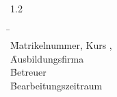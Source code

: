 \begin{titlepage}
\begin{spacing}{1.2}
        \centering
        \begin{tabbing}
            \hspace{0.5\textwidth}                 \= \kill                       \\
            \f{Matrikelnummer, Kurs}               \>  \myMatrikelnummer, \myKurs \\
            \f{Ausbildungsfirma}                   \>  \myAusbildungsfirma        \\
            \f{Betreuer}                           \>  \myErstgutachter           \\
            \f{Bearbeitungszeitraum}               \>  \Bearbeitungszeitraum      \\
        \end{tabbing}
    \end{spacing}
\end{titlepage}
